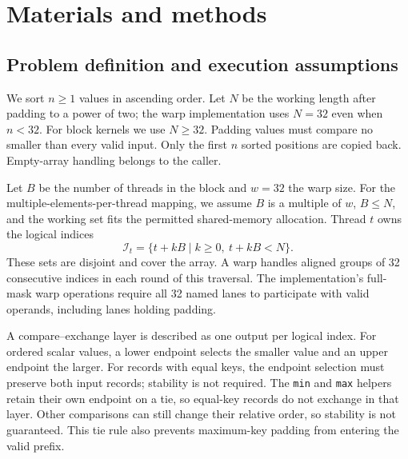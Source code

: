 \documentclass[fleqn,10pt,lineno]{wlpeerj}
\begin{document}
\section*{Materials and methods}
\label{sec:methods}
\subsection*{Problem definition and execution assumptions}
We sort $n\geq 1$ values in ascending order. Let $N$ be the working length after padding to a power of two; the warp implementation uses $N=32$ even when $n<32$. For block kernels we use $N\geq32$. Padding values must compare no smaller than every valid input. Only the first $n$ sorted positions are copied back. Empty-array handling belongs to the caller.

Let $B$ be the number of threads in the block and $w=32$ the warp size. For the multiple-elements-per-thread mapping, we assume $B$ is a multiple of $w$, $B\leq N$, and the working set fits the permitted shared-memory allocation. Thread $t$ owns the logical indices
\begin{equation}
\mathcal{I}_t=\{t+kB\mid k\geq0,\ t+kB<N\}.
\label{eq:ownership}
\end{equation}
These sets are disjoint and cover the array. A warp handles aligned groups of 32 consecutive indices in each round of this traversal. The implementation's full-mask warp operations require all 32 named lanes to participate with valid operands, including lanes holding padding.

A compare--exchange layer is described as one output per logical index. For ordered scalar values, a lower endpoint selects the smaller value and an upper endpoint the larger. For records with equal keys, the endpoint selection must preserve both input records; stability is not required. The \texttt{min} and \texttt{max} helpers retain their own endpoint on a tie, so equal-key records do not exchange in that layer. Other comparisons can still change their relative order, so stability is not guaranteed. This tie rule also prevents maximum-key padding from entering the valid prefix.
\end{document}
